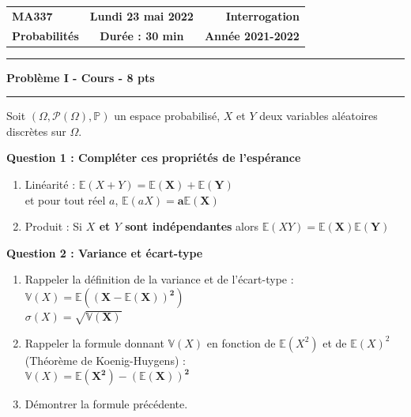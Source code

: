 \documentclass[11pt, a4paper]{article}
\begin{document}
\noindent
\begin{tabularx}{\textwidth}{@{}X c r@{}}
\textbf{MA337} & \textbf{Lundi 23 mai 2022} & \textbf{Interrogation} \\
\textbf{Probabilités} & \textbf{Durée : 30 min} & \textbf{Année 2021-2022} \\
\end{tabularx}
\vspace{0.2cm}
\hrule
\vspace{0.4cm}

\begin{center}
    \textbf{\Large Problème I - Cours - 8 pts}
\end{center}
\vspace{-0.2cm}
\hrule
\vspace{0.3cm}

\noindent Soit $(\Omega,\mathcal{P}(\Omega),\mathbb{P})$ un espace probabilisé, $X$ et $Y$ deux variables aléatoires discrètes sur $\Omega$.

\vspace{0.3cm}
\noindent \textbf{Question 1 : Compléter ces propriétés de l'espérance}
\begin{enumerate}
    \item[(a)] Linéarité : $\mathbb{E}(X+Y) = \mathbf{\mathbb{E}(X) + \mathbb{E}(Y)}$ \\
    et pour tout réel $a$, $\mathbb{E}(aX) = \mathbf{a\mathbb{E}(X)}$
    \item[(b)] Produit : Si \textbf{$X$ et $Y$ sont indépendantes} alors $\mathbb{E}(XY) = \mathbf{\mathbb{E}(X)\mathbb{E}(Y)}$
\end{enumerate}

\vspace{0.3cm}
\noindent \textbf{Question 2 : Variance et écart-type}
\begin{enumerate}
    \item[(a)] Rappeler la définition de la variance et de l'écart-type : \\
    $\mathbb{V}(X) = \mathbf{\mathbb{E}\left((X - \mathbb{E}(X))^2\right)}$ \\
    $\sigma(X) = \mathbf{\sqrt{\mathbb{V}(X)}}$
    
    \item[(b)] Rappeler la formule donnant $\mathbb{V}(X)$ en fonction de $\mathbb{E}(X^2)$ et de $\mathbb{E}(X)^2$ (Théorème de Koenig-Huygens) : \\
    $\mathbb{V}(X) = \mathbf{\mathbb{E}(X^2) - (\mathbb{E}(X))^2}$
    
    \item[(c)] Démontrer la formule précédente.
\end{enumerate}
\end{document}
